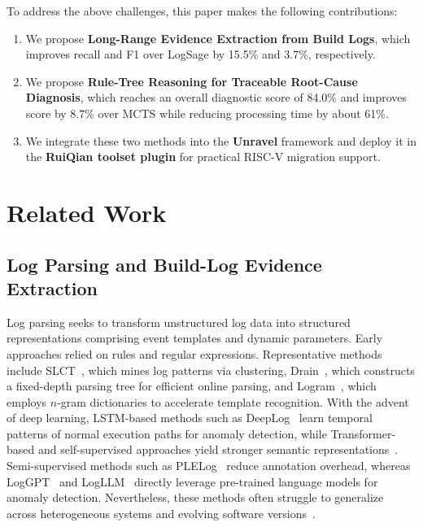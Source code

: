 \documentclass[sigconf]{acmart}
\begin{document}
To address the above challenges, this paper makes the following contributions:
\begin{enumerate}
\item We propose \textbf{Long-Range Evidence Extraction from Build Logs}, which improves recall and F1 over LogSage by 15.5\% and 3.7\%, respectively.
\item We propose \textbf{Rule-Tree Reasoning for Traceable Root-Cause Diagnosis}, which reaches an overall diagnostic score of 84.0\% and improves score by 8.7\% over MCTS while reducing processing time by about 61\%.
\item We integrate these two methods into the \textbf{Unravel} framework and deploy it in the \textbf{RuiQian toolset plugin} for practical RISC-V migration support.
\end{enumerate}

\section{Related Work}

\subsection{Log Parsing and Build-Log Evidence Extraction}

Log parsing seeks to transform unstructured log data into structured representations comprising event templates and dynamic parameters. Early approaches relied on rules and regular expressions. Representative methods include SLCT~\cite{vaarandi2008mining}, which mines log patterns via clustering, Drain~\cite{he2017drain}, which constructs a fixed-depth parsing tree for efficient online parsing, and Logram~\cite{dai2020logram}, which employs $n$-gram dictionaries to accelerate template recognition. With the advent of deep learning, LSTM-based methods such as DeepLog~\cite{du2017deeplog} learn temporal patterns of normal execution paths for anomaly detection, while Transformer-based and self-supervised approaches yield stronger semantic representations~\cite{guo2021logbert,chen2022bert}. Semi-supervised methods such as PLELog~\cite{yang2021plelog} reduce annotation overhead, whereas LogGPT~\cite{qi2023loggpt} and LogLLM~\cite{guan2024logllm} directly leverage pre-trained language models for anomaly detection. Nevertheless, these methods often struggle to generalize across heterogeneous systems and evolving software versions~\cite{le2022log}.
\end{document}
